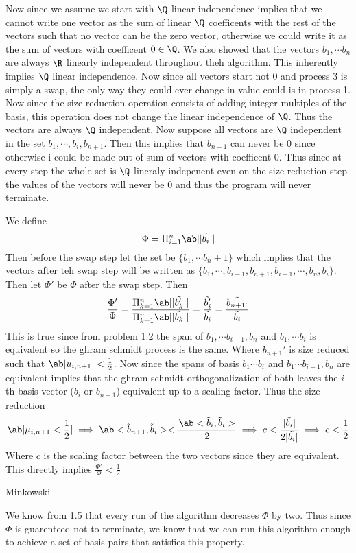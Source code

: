 \documentclass[12pt]{amsart}
\begin{document}
\begin{problem}
\begin{subproblem}
      Now since we assume we start with $\Q$ linear independence implies that we cannot write one vector as the sum of linear $\Q$ coefficents with the rest of the vectors such that no vector can be the zero vector, otherwise we could write it as the sum of vectors with coefficent $0\in\Q$. We also showed that the vectors $b_1,\cdots b_n$ are always $\R$ linearly independent throughout theh algorithm. This inherently implies $\Q$ linear independence.
      Now since all vectors start not $0$ and process $3$ is simply a swap, the only way they could ever change in value could is in process 1.
      Now since the size reduction operation consists of adding integer multiples of the basis, this operation does not change the linear independence of $\Q$. Thus the vectors are always $\Q$ independent.
      Now suppose all vectors are $\Q$ independent in the set $b_1,\cdots,b_i,b_{n+1}$. Then this implies that $b_{n+1}$ can never be 0 since otherwise i could be made out of sum of vectors with coefficent 0. Thus since at every step the whole set is $\Q$ lineraly indepenent even on the size reduction step the values of the vectors will never be $0$ and thus the program will never terminate.
    \end{subproblem}
    \begin{subproblem}
      We define 
      \[\Phi= \Pi^n_{i=1}\ab||\tilde{b_i}||\]
      Then before the swap step let the set be $\{b_1,\cdots b_n+1\}$ which implies that the vectors after teh swap step will be written as 
      $\{b_1,\cdots,b_{i-1}, b_{n+1}, b_{i+1}, \cdots, b_n, b_i\}$. Then let $\Phi'$ be $\Phi$ after the swap step. Then 
    \[\frac{\Phi'}\Phi= \frac{\Pi^n_{k=1}\ab||\tilde{b_k'}||}{\Pi^n_{k=1}\ab||\tilde{b_k}||} = \frac{\tilde{b_i'}}{\tilde{b_i}}=\frac{\tilde{b_{n+1'}}}{\tilde{b_i}}\]
    This is true since from problem 1.2 the span of $b_1,\cdots b_{i-1},b_n$ and $b_1, \cdots b_i$ is equivalent so the ghram schmidt process is the same. 
    Where $\tilde{b_{n+1}}'$ is size reduced such that $\ab|u_{i,n+1}| < \frac12$. Now since 
    the spans of basis $b_1\cdots b_i$ and $b_1 \cdots b_{i-1}, b_n$ are equivalent implies that the ghram schmidt orthogonalization of both leaves the $i$th basis vector ($b_i$ or $b_{n+1}$) equivalent up to a scaling factor. Thus the size reduction 
    \[\ab|\mu_{i,n+1}<\frac12| \implies \ab<\tilde b_{n+1}, \tilde b_i> < \frac{\ab<\tilde b_i, \tilde b_i>}2\implies c < \frac{|\tilde{b_i}|}{2|\tilde{b_i}|}\implies c < \frac12\]
    Where $c$ is the scaling factor between the two vectors since they are equivalent. This directly implies $\frac{\Phi'}{\Phi} < \frac12$
    \end{subproblem}
    \begin{subproblem}
      Minkowski 
    \end{subproblem}
    \begin{subproblem}
      We know from 1.5 that every run of the algorithm decreases $\Phi$ by two. Thus since $\Phi$ is guarenteed not to terminate, we know that we can run this algorithm enough to achieve a set of basis pairs that satisfies this property.


\end{subproblem}
\end{problem}
\end{document}
